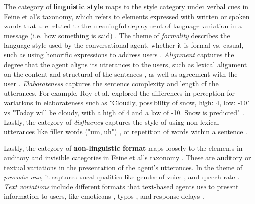 \documentclass[sigconf,screen,review, anonymous]{acmart}
\newcommand{\cmt}[1]{}%
\begin{document}
The category of \textbf{linguistic style} maps to the style category under verbal cues in Feine et al's taxonomy, which refers to elements expressed with written or spoken words that are related to the meaningful deployment of language variation in a message (i.e. how something is said) \cite{feine2019taxonomy}. The theme of \textit{formality} describes the language style used by the conversational agent, whether it is formal vs. casual, such as using honorific expressions to address users \cite{ouchi2019should}\cmt{[59]}. \textit{Alignment} captures the degree that the agent aligns its utterances to the users, such as lexical alignment on the content and structural of the sentences \cite{huiyang2022improving}\cmt{[17]}\cite{linnemann2018can}\cmt{[15]}, as well as agreement with the user \cite{volkel2021examining}\cmt{[69]}. \textit{Elaborateness} captures the sentence complexity and length of the utterances. For example, Roy et al. explored the differences in perception for variations in elaborateness such as "Cloudly, possibility of snow, high: 4, low: -10" vs "Today will be cloudy, with a high of 4 and a low of -10. Snow is predicted" \cite{roy2021users}\cmt{[71]}. Lastly, the category of \textit{disfluency} captures the style of using non-lexical utterances like filler words ("um, uh") \cite{hu2021enhancing}\cmt{[56]}\cite{jeong2019exploring}\cmt{[10]}, or repetition of words within a sentence \cite{yang2021effect}\cmt{[72]}. 

Lastly, the category of \textbf{non-linguistic format} maps loosely to the elements in auditory and invisible categories in Feine et al's taxonomy \cite{feine2019taxonomy}. These are auditory or textual variations in the presentation of the agent's utterances. In the theme of \textit{prosodic cue}, it captures vocal qualities like gender of voice \cite{habler2019effects}\cmt{[63]}\cite{jestin2022effects}\cmt{[81]}, and speech rate \cite{choi2020nobody}\cmt{[54]}. \textit{Text variations} include different formats that text-based agents use to present information to users, like emoticons \cite{kim2019comparing}\cmt{[89]}\cite{wilhelm2022keep}\cmt{[28]}, typos \cite{westerman2019believe}\cmt{[9]}, and response delays \cite{gnewuch2022opposing}\cmt{[20]}\cite{seeger2021chatbots}\cmt{[35]}.
\end{document}
